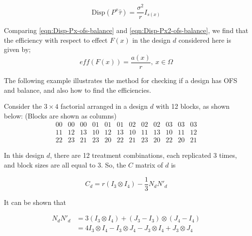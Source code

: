 \documentclass[12pt]{article}
\theoremstyle{definition}
\newenvironment{example}[1][\unskip]{
\begin{tcolorbox}[colback=blue!5!white,colframe=blue!75!black, title = {Example #1}, parbox = false] }{\end{tcolorbox} }
\begin{document}
\begin{equation}
    \mbox{Disp}(P^x\hat{\tau}) =  \frac{\sigma^2} {r} I_{s(x)} \label{eqn:Disp-Px2-ofs-balance}
\end{equation}

Comparing \eqref{eqn:Disp-Px-ofs-balance} and \eqref{eqn:Disp-Px2-ofs-balance}, we find that the efficiency with respect to effect $F(x)$ in the design  $d$ considered here  is given by;
\begin{equation}
    eff(F(x))  = \frac{a(x)}{r}, \ x \in \Omega \label{eqn:efficient-factorial}
\end{equation}

The following example illustrates the method for checking if a design has OFS and balance, and also how to find the efficiencies.

\begin{example}
    Consider the $3 \times 4$ factorial arranged in a design $d$ with 12 blocks, as shown below: (Blocks are shown as columns)
$$\begin{array}{cccccccccccc}
	00 & 00 & 00 & 01 & 01 & 01 & 02 & 02 & 02 & 03 & 03 & 03 \\ 
	11 & 12 & 13 & 10 & 12 & 13 & 10 & 11 & 13 & 10 & 11 & 12 \\ 
	22 & 23 & 21 & 23 & 20 & 22 & 21 & 23 & 20 & 22 & 20 & 21 
\end{array}$$

In this design $d$, there are 12 treatment combinations, each replicated 3 times, and block sizes are all equal to 3. So, the $C$ matrix of $d$ is 

$$C_d = r(I_3\otimes I_4) - \frac{1}{3} N_d N'_d $$

It can be shown that 

\begin{align*}
    N_dN'_d  & = 3(I_3\otimes I_4) + (J_3-I_3)\otimes(J_4-I_4)\\ 
    & = 4I_3\otimes I_4 - I_3\otimes J_4 - J_3 \otimes I_4 + J_3\otimes J_4  
\end{align*}

\end{example}
\end{document}
